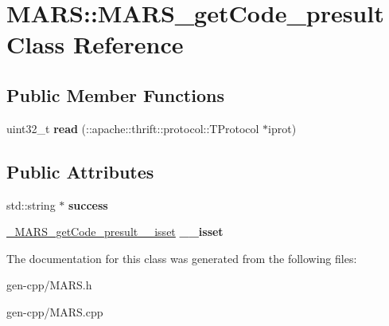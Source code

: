 \hypertarget{classMARS_1_1MARS__getCode__presult}{}\section{M\+A\+RS\+:\+:M\+A\+R\+S\+\_\+get\+Code\+\_\+presult Class Reference}
\label{classMARS_1_1MARS__getCode__presult}
\subsection*{Public Member Functions}
\begin{DoxyCompactItemize}
\item 
\mbox{\label{classMARS_1_1MARS__getCode__presult_a6f4847fe64084025d7f8ed311281a800}} 
uint32\+\_\+t {\bfseries read} (\+::apache\+::thrift\+::protocol\+::\+T\+Protocol $\ast$iprot)
\end{DoxyCompactItemize}
\subsection*{Public Attributes}
\begin{DoxyCompactItemize}
\item 
\mbox{\label{classMARS_1_1MARS__getCode__presult_a22629788323ebe3c8f7c0cf710657ad6}} 
std\+::string $\ast$ {\bfseries success}
\item 
\mbox{\label{classMARS_1_1MARS__getCode__presult_ad0ab0a2e93de6852ab4c5b160c93c778}} 
\hyperlink{structMARS_1_1__MARS__getCode__presult____isset}{\+\_\+\+M\+A\+R\+S\+\_\+get\+Code\+\_\+presult\+\_\+\+\_\+isset} {\bfseries \+\_\+\+\_\+isset}
\end{DoxyCompactItemize}


The documentation for this class was generated from the following files\+:\begin{DoxyCompactItemize}
\item 
gen-\/cpp/M\+A\+R\+S.\+h\item 
gen-\/cpp/M\+A\+R\+S.\+cpp\end{DoxyCompactItemize}
